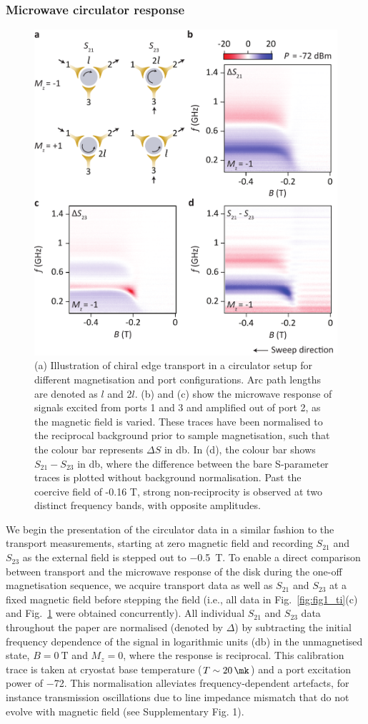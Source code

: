 \subsubsection{Microwave circulator response}
\begin{figure}
\includegraphics[width=0.7\linewidth]{Fig2_TI}
\caption[Microwave transmission measurement of 3D-TI based circulator]{\label{fig:fig2_ti}(a) Illustration of chiral edge transport in a circulator setup for different magnetisation and port configurations. Arc path lengths are denoted as $l$ and 2$l$. (b) and (c) show the microwave response of signals excited from ports 1 and 3 and amplified out of port 2, as the  magnetic field is varied. These traces have been normalised to the reciprocal background prior to sample magnetisation, such that the colour bar represents $\Delta S$ in \si{\decibel}. In (d), the colour bar shows $S_{21} - S_{23}$ in \si{\decibel}, where the difference between the bare S-parameter traces is plotted without background normalisation. Past the coercive field of -0.16 T, strong non-reciprocity is observed at two distinct frequency bands, with opposite amplitudes.}
\end{figure}
We begin the presentation of the circulator data in a similar fashion to the transport measurements, starting at zero magnetic field and recording $S_{21}$ and $S_{23}$ as the external field is stepped out to \SI{-0.5}{\tesla}. To enable a direct comparison between transport and the microwave response of the disk during the one-off magnetisation sequence, we acquire transport data as well as $S_{21}$ and $S_{23}$ at a fixed magnetic field before stepping the field (i.e., all data in Fig.~\ref{fig:fig1_ti}(c) and Fig.~\ref{fig:fig2_ti} were obtained concurrently). All individual $S_{21}$ and $S_{23}$ data throughout the paper are normalised (denoted by $\Delta$) by subtracting the initial frequency dependence of the signal in logarithmic units (\si{\decibel}) in the unmagnetised state, $B = \SI{0}{\tesla}$ and $M_z = 0$, where the response is reciprocal. This calibration trace is taken at cryostat base temperature ($T \sim \SI{20}{\mk}$) and a port excitation power of \SI{-72}{\dBm}.  This normalisation alleviates frequency-dependent artefacts, for instance transmission oscillations due to line impedance mismatch that do not evolve with magnetic field (see Supplementary Fig. 1).

